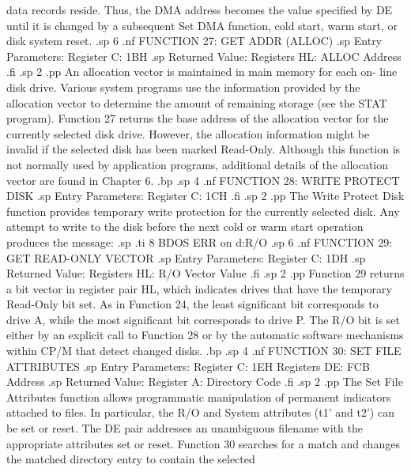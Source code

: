 data records reside.  Thus, the DMA address becomes the value 
specified by DE until it is changed by a subsequent Set DMA 
function, cold start, warm start, or disk system reset.
.sp 6
.nf
                 FUNCTION 27:  GET ADDR (ALLOC)
.sp
              Entry Parameters:
                    Register C:  1BH
.sp
              Returned Value:
                  Registers HL:  ALLOC Address
.fi
.sp 2
.pp
An allocation vector is maintained in main memory for each on-
line disk drive.  Various system programs use the information 
provided by the allocation vector to determine the amount of 
remaining storage (see the STAT program).  Function 27 returns 
the base address of the allocation vector for the currently 
selected disk drive.  However, the allocation information might be 
invalid if the selected disk has been marked Read-Only.  Although 
this function is not normally used by application programs, 
additional details of the allocation vector are found in Chapter 
6.
.bp
.sp 4
.nf
                FUNCTION 28:  WRITE PROTECT DISK
.sp
                    Entry Parameters:
                          Register C:  1CH
.fi
.sp 2
.pp
The Write Protect Disk function provides temporary write 
protection for the currently selected disk.  Any attempt to write 
to the disk before the next cold or warm start operation produces 
the message:
.sp 
.ti 8
BDOS ERR on d:R/O
.sp 6
.nf
               FUNCTION 29:  GET READ-ONLY VECTOR
.sp
             Entry Parameters:
                   Register C:  1DH
.sp
             Returned Value:
                 Registers HL:  R/O Vector Value
.fi
.sp 2
.pp
Function 29 returns a bit vector in register pair HL, which 
indicates drives that have the temporary Read-Only bit set.  As 
in Function 24, the least significant bit corresponds to drive A, 
while the most significant bit corresponds to drive P.  The R/O 
bit is set either by an explicit call to Function 28 or by the 
automatic software mechanisms within CP/M that detect changed 
disks.
.bp
.sp 4
.nf
                FUNCTION 30:  SET FILE ATTRIBUTES
.sp
             Entry Parameters:
                   Register C:  1EH
                 Registers DE:  FCB Address
.sp
             Returned Value:
                  Register  A:  Directory Code
.fi
.sp 2
.pp
The Set File Attributes function allows programmatic manipulation 
of permanent indicators attached to files.  In particular, the R/O 
and System attributes (t1' and t2') can be set or reset.  The DE 
pair addresses an unambiguous filename with the appropriate 
attributes set or reset.  Function 30 searches for a match and 
changes the matched directory entry to contain the selected 
